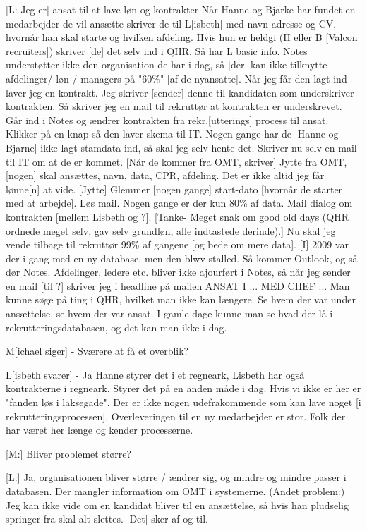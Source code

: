 [L: Jeg er] ansat til at lave løn og kontrakter
Når Hanne og Bjarke har fundet en medarbejder de vil ansætte skriver de til L[isbeth] med navn adresse og CV, hvornår han skal starte og hvilken afdeling.
Hvis hun er heldgi (H eller B [Valcon recruiters]) skriver [de] det selv ind i QHR. Så har L basic info. Notes understøtter ikke den organisation de har i dag, så [der] kan ikke tilknytte afdelinger/ løn / managers på "60\%" [af de nyansatte]. Når jeg får den lagt ind laver jeg en kontrakt. Jeg skriver [sender] denne til kandidaten som underskriver kontrakten.
Så skriver jeg en mail til rekruttør at kontrakten er underskrevet. Går ind i Notes og ændrer kontrakten fra rekr.[utterings] process til ansat. Klikker på en knap så den laver skema til IT. Nogen gange har de [Hanne og Bjarne] ikke lagt stamdata ind, så skal jeg selv hente det.
Skriver nu selv en mail til IT om at de er kommet.
[Når de kommer fra OMT, skriver] Jytte fra OMT, [nogen] skal ansættes, navn, data, CPR, afdeling. Det er ikke altid jeg får lønne[n] at vide. [Jytte] Glemmer [nogen gange] start-dato [hvornår de starter med at arbejde]. Løs mail. Nogen gange er der kun 80\% af data.
Mail dialog om kontrakten [mellem Lisbeth og ?].
[Tanke- Meget snak om good old days (QHR ordnede meget selv, gav selv grundløn, alle indtastede derinde).]
Nu skal jeg vende tilbage til rekruttør 99\% af gangene [og bede om mere data].
[I] 2009 var der i gang med en ny database, men den blwv stalled. Så kommer Outlook, og så dør Notes. Afdelinger, ledere etc. bliver ikke ajourført i Notes, så når jeg sender en mail [til ?] skriver jeg i headline på mailen ANSAT I ... MED CHEF ...
Man kunne søge på ting i QHR, hvilket man ikke kan længere. Se hvem der var under ansættelse, se hvem der var ansat. I gamle dage kunne man se hvad der lå i rekrutteringsdatabasen, og det kan man ikke i dag.

M[ichael siger] - Sværere at få et overblik?

L[isbeth svarer] - Ja
Hanne styrer det i et regneark, Lisbeth har også kontrakterne i regneark. Styrer det på en anden måde i dag. Hvis vi ikke er her er "fanden løs i laksegade". Der er ikke nogen udefrakommende som kan lave noget [i rekrutteringsprocessen]. Overleveringen til en ny medarbejder er stor. Folk der har været her længe og kender processerne.

[M:] Bliver problemet større?

[L:] Ja, organisationen bliver større / ændrer sig, og mindre og mindre passer i databasen. Der mangler information om OMT i systemerne. 
(Andet problem:)
Jeg kan ikke vide om en kandidat bliver til en ansættelse, så hvis han pludselig springer fra skal alt slettes. [Det] sker af og til.


